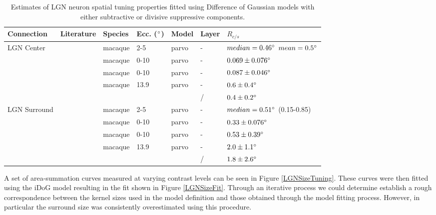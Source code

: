 \begin{table}
  \centering
  \begin{adjustbox}{width=1\textwidth}
  \begin{tabular}{l | l l l l l l}
    Connection   & Literature            & Species  & Ecc. ($\degree$) & Model & Layer & $R_{c/s}$ \\
    \hline
    LGN Center   & \cite{Sceniak2006}    & macaque  & 2-5  & parvo & - & $median = 0.46 \degree$ $mean = 0.5 \degree$ \\
                 & \cite{Levitt2001}     & macaque  & 0-10 & parvo & - & $0.069 \pm 0.076 \degree$ \\
                 & \cite{Spear1994}      & macaque  & 0-10 & parvo & - & $0.087 \pm 0.046 \degree$ \\
                 & \cite{Bonin2005}      & macaque  & 13.9 & parvo & - & $0.6 \pm 0.4 \degree$\\
                 &                       &          &      &       & / & $0.4 \pm 0.2 \degree$ \\
    \hline
    LGN Surround & \cite{Sceniak2006}    & macaque  & 2-5  & parvo & - &$median = 0.51 \degree$ (0.15-0.85) \\
                 & \cite{Levitt2001}     & macaque  & 0-10 & parvo & - & $0.33 \pm 0.076 \degree$ \\
                 & \cite{Spear1994}      & macaque  & 0-10 & parvo & - & $0.53 \pm 0.39 \degree$ \\
                 & \cite{Bonin2005}      & macaque  & 13.9 & parvo & - & $2.0 \pm 1.1 \degree$\\
                 &                       &          &      &       & / & $1.8 \pm 2.6 \degree$\\

    \hline
  \end{tabular}
  \end{adjustbox}
  \caption{Estimates of LGN neuron spatial tuning properties fitted using Difference of Gaussian models
           with either subtractive or divisive suppressive components.}
  \label{LGNEstimates}
\end{table}

A set of area-summation curves measured at varying contrast levels can
be seen in Figure \ref{LGNSizeTuning}. These curves were then fitted
using the iDoG model resulting in the fit shown in Figure
\ref{LGNSizeFit}. Through an iterative process we could determine
establish a rough correspondence between the kernel sizes used in the
model definition and those obtained through the model fitting
process. However, in particular the surround size was consistently
overestimated using this procedure.

